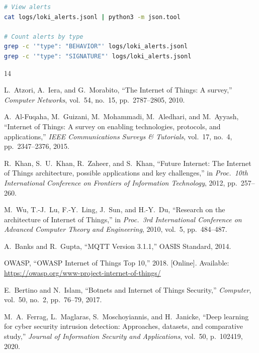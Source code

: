 \documentclass[12pt,a4paper]{article}
\begin{document}
\begin{lstlisting}[language=bash]
# View alerts
cat logs/loki_alerts.jsonl | python3 -m json.tool

# Count alerts by type
grep -c '"type": "BEHAVIOR"' logs/loki_alerts.jsonl
grep -c '"type": "SIGNATURE"' logs/loki_alerts.jsonl
\end{lstlisting}


\newpage
\begin{thebibliography}{14}

L.~Atzori, A.~Iera, and G.~Morabito,
``The Internet of Things: A survey,''
\emph{Computer Networks}, vol.~54, no.~15, pp.~2787--2805, 2010.

A.~Al-Fuqaha, M.~Guizani, M.~Mohammadi, M.~Aledhari, and M.~Ayyash,
``Internet of Things: A survey on enabling technologies, protocols, and applications,''
\emph{IEEE Communications Surveys \& Tutorials}, vol.~17, no.~4, pp.~2347--2376, 2015.

R.~Khan, S.~U.~Khan, R.~Zaheer, and S.~Khan,
``Future Internet: The Internet of Things architecture, possible applications and key challenges,''
in \emph{Proc.\ 10th International Conference on Frontiers of Information Technology}, 2012, pp.~257--260.

M.~Wu, T.-J.~Lu, F.-Y.~Ling, J.~Sun, and H.-Y.~Du,
``Research on the architecture of Internet of Things,''
in \emph{Proc.\ 3rd International Conference on Advanced Computer Theory and Engineering}, 2010, vol.~5, pp.~484--487.

A.~Banks and R.~Gupta,
``MQTT Version 3.1.1,''
OASIS Standard, 2014.

OWASP,
``OWASP Internet of Things Top 10,''
2018.
[Online]. Available: \url{https://owasp.org/www-project-internet-of-things/}

E.~Bertino and N.~Islam,
``Botnets and Internet of Things Security,''
\emph{Computer}, vol.~50, no.~2, pp.~76--79, 2017.

M.~A.~Ferrag, L.~Maglaras, S.~Moschoyiannis, and H.~Janicke,
``Deep learning for cyber security intrusion detection: Approaches, datasets, and comparative study,''
\emph{Journal of Information Security and Applications}, vol.~50, p.~102419, 2020.


\end{thebibliography}
\end{document}
